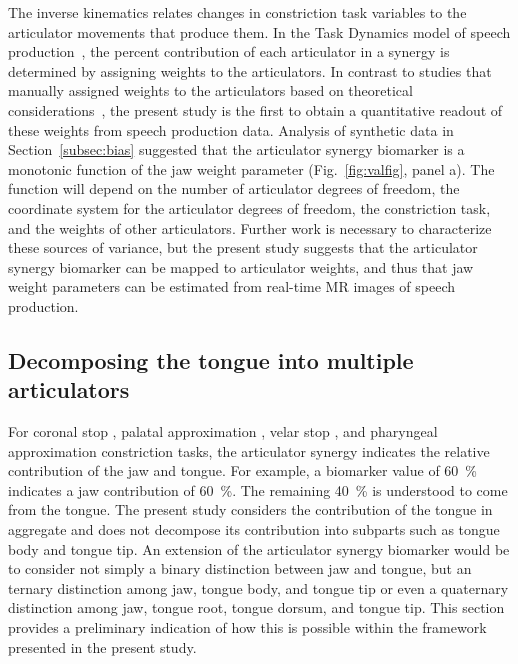 \documentclass[preprint]{JASAnew}\usepackage[]{graphicx}\usepackage[]{color}
\begin{document}
The inverse kinematics relates changes in constriction task variables to the articulator movements that produce them. 
%
In the Task Dynamics model of speech production~\citep{saltzman1989dynamical}, the percent contribution of each articulator in a synergy is determined by assigning weights to the articulators. 
%
In contrast to studies that manually assigned weights to the articulators based on theoretical considerations~\citep[for example, see][for an assignment of weights based on articulator mass]{simko2010embodied}, the present study is the first to obtain a quantitative readout of these weights from speech production data. 
%
Analysis of synthetic data in Section~\ref{subsec:bias} suggested that the articulator synergy biomarker is a monotonic function of the jaw weight parameter (Fig.~\ref{fig:valfig}, panel a).
%
The function will depend on the number of articulator degrees of freedom, the coordinate system for the articulator degrees of freedom, the constriction task, and the weights of other articulators. Further work is necessary to characterize these sources of variance, but the present study suggests that the articulator synergy biomarker can be mapped to articulator weights, and thus that jaw weight parameters can be estimated from real-time MR images of speech production.




\subsection{Decomposing the tongue into multiple articulators}

For coronal stop \textipa{[t]}, palatal approximation \textipa{[i]}, velar stop \textipa{[k]}, and pharyngeal approximation \textipa{[A]} constriction tasks,
the articulator synergy indicates the relative contribution of the jaw and tongue.
%
For example, a biomarker value of \SI{60}{\percent} indicates a jaw contribution of  \SI{60}{\percent}. The remaining \SI{40}{\percent} is understood to come from the tongue.
%
The present study considers the contribution of the tongue in aggregate and does not decompose its contribution into subparts such as tongue body and tongue tip.
%
An extension of the articulator synergy biomarker would be to consider not simply a binary distinction between jaw and tongue, but an ternary distinction among jaw, tongue body, and tongue tip or even a quaternary distinction among jaw, tongue root, tongue dorsum, and tongue tip.
%
This section provides a preliminary indication of how this is possible within the framework presented in the present study.
\end{document}
